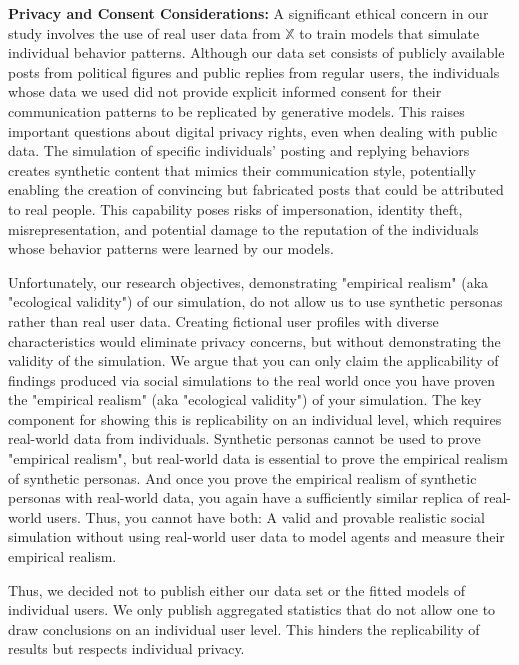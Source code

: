 \textbf{Privacy and Consent Considerations:} A significant ethical concern in our study involves the use of real user data from $\mathbb{X}$ to train models that simulate individual behavior patterns. Although our data set consists of publicly available posts from political figures and public replies from regular users, the individuals whose data we used did not provide explicit informed consent for their communication patterns to be replicated by generative models. This raises important questions about digital privacy rights, even when dealing with public data. The simulation of specific individuals' posting and replying behaviors creates synthetic content that mimics their communication style, potentially enabling the creation of convincing but fabricated posts that could be attributed to real people. This capability poses risks of impersonation, identity theft, misrepresentation, and potential damage to the reputation of the individuals whose behavior patterns were learned by our models.

Unfortunately, our research objectives, demonstrating "empirical realism" (aka "ecological validity") of our simulation, do not allow us to use synthetic personas rather than real user data. Creating fictional user profiles with diverse characteristics would eliminate privacy concerns, but without demonstrating the validity of the simulation. We argue that you can only claim the applicability of findings produced via social simulations to the real world once you have proven the "empirical realism" (aka "ecological validity") of your simulation. The key component for showing this is replicability on an individual level, which requires real-world data from individuals. Synthetic personas cannot be used to prove "empirical realism", but real-world data is essential to prove the empirical realism of synthetic personas. And once you prove the empirical realism of synthetic personas with real-world data, you again have a sufficiently similar replica of real-world users. Thus, you cannot have both: A valid and provable realistic social simulation without using real-world user data to model agents and measure their empirical realism.

Thus, we decided not to publish either our data set or the fitted models of individual users. We only publish aggregated statistics that do not allow one to draw conclusions on an individual user level. This hinders the replicability of results but respects individual privacy.


